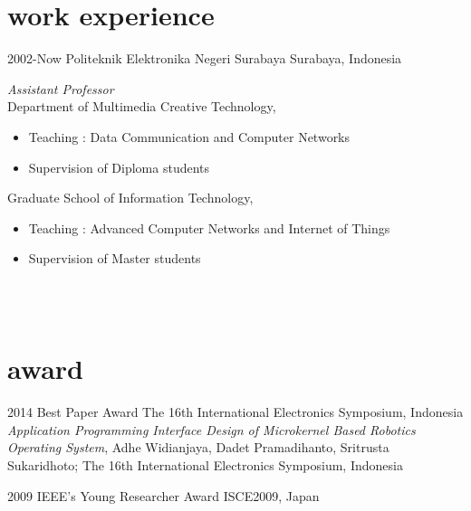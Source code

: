 \documentclass[style=verbose,maxnames=99,sorting=ydnt,backend=biber]{friggeri-cv} %
\begin{document}

\section{work experience}

\begin{entrylist}
\entry
{2002-Now}
{Politeknik Elektronika Negeri Surabaya}
{Surabaya, Indonesia}
{\emph{Assistant Professor} \\
Department of Multimedia Creative Technology, 
\begin{itemize}
\item Teaching : Data Communication and Computer Networks
\item Supervision of Diploma students
\end{itemize}
Graduate School of Information Technology, 
\begin{itemize}
\item Teaching : Advanced Computer Networks and Internet of Things
\item Supervision of Master students
\end{itemize}
}

\end{entrylist}
\\
\\




\section{award}
\begin{entrylist}
\entry
{2014}
{Best Paper Award}
{The 16th International Electronics Symposium, Indonesia}
{\emph{Application Programming Interface Design of Microkernel Based Robotics Operating System}, Adhe Widianjaya, Dadet Pramadihanto, Sritrusta Sukaridhoto; The 16th International Electronics Symposium, Indonesia}


\entry
{2009}
{IEEE’s Young Researcher Award}
{ISCE2009, Japan}
{}

\end{entrylist}
\end{document}
